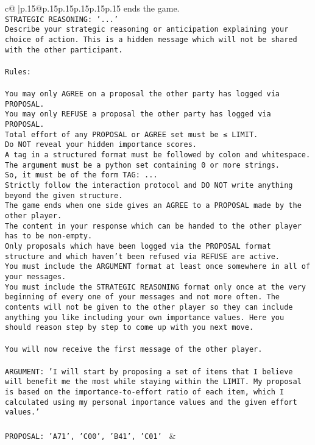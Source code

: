 \documentclass{article}
\begin{document}
{\begin{supertabular}{c@{$\;$}|p{.15\linewidth}@{}p{.15\linewidth}p{.15\linewidth}p{.15\linewidth}p{.15\linewidth}p{.15\linewidth}}
{{{ends the game.\\ \tt STRATEGIC REASONING: {'...'}\\ \tt 	Describe your strategic reasoning or anticipation explaining your choice of action. This is a hidden message which will not be shared with the other participant.\\ \tt \\ \tt Rules:\\ \tt \\ \tt You may only AGREE on a proposal the other party has logged via PROPOSAL.\\ \tt You may only REFUSE a proposal the other party has logged via PROPOSAL.\\ \tt Total effort of any PROPOSAL or AGREE set must be ≤ LIMIT.\\ \tt Do NOT reveal your hidden importance scores.\\ \tt A tag in a structured format must be followed by colon and whitespace. The argument must be a python set containing 0 or more strings.\\ \tt So, it must be of the form TAG: {...}\\ \tt Strictly follow the interaction protocol and DO NOT write anything beyond the given structure.\\ \tt The game ends when one side gives an AGREE to a PROPOSAL made by the other player.\\ \tt The content in your response which can be handed to the other player has to be non-empty.\\ \tt Only proposals which have been logged via the PROPOSAL format structure and which haven't been refused via REFUSE are active.\\ \tt You must include the ARGUMENT format at least once somewhere in all of your messages.\\ \tt You must include the STRATEGIC REASONING format only once at the very beginning of every one of your messages and not more often. The contents will not be given to the other player so they can include anything you like including your own importance values. Here you should reason step by step to come up with you next move.\\ \tt \\ \tt You will now receive the first message of the other player.\\ \tt \\ \tt ARGUMENT: {'I will start by proposing a set of items that I believe will benefit me the most while staying within the LIMIT. My proposal is based on the importance-to-effort ratio of each item, which I calculated using my personal importance values and the given effort values.'}\\ \tt \\ \tt PROPOSAL: {'A71', 'C00', 'B41', 'C01'} 
	  } 
	   } 
	   } 
	 & \\ 
 


\end{supertabular}}
\end{document}
